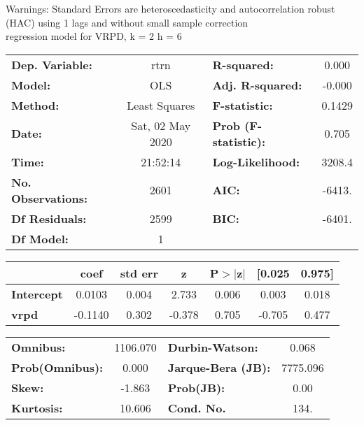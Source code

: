 Warnings: \newline
 [1] Standard Errors are heteroscedasticity and autocorrelation robust (HAC) using 1 lags and without small sample correction\\ 

regression model for VRPD, k = 2 h = 6\begin{center}
\begin{tabular}{lclc}
\toprule
\textbf{Dep. Variable:}    &       rtrn       & \textbf{  R-squared:         } &     0.000   \\
\textbf{Model:}            &       OLS        & \textbf{  Adj. R-squared:    } &    -0.000   \\
\textbf{Method:}           &  Least Squares   & \textbf{  F-statistic:       } &    0.1429   \\
\textbf{Date:}             & Sat, 02 May 2020 & \textbf{  Prob (F-statistic):} &    0.705    \\
\textbf{Time:}             &     21:52:14     & \textbf{  Log-Likelihood:    } &    3208.4   \\
\textbf{No. Observations:} &        2601      & \textbf{  AIC:               } &    -6413.   \\
\textbf{Df Residuals:}     &        2599      & \textbf{  BIC:               } &    -6401.   \\
\textbf{Df Model:}         &           1      & \textbf{                     } &             \\
\bottomrule
\end{tabular}
\begin{tabular}{lcccccc}
                   & \textbf{coef} & \textbf{std err} & \textbf{z} & \textbf{P$> |$z$|$} & \textbf{[0.025} & \textbf{0.975]}  \\
\midrule
\textbf{Intercept} &       0.0103  &        0.004     &     2.733  &         0.006        &        0.003    &        0.018     \\
\textbf{vrpd}      &      -0.1140  &        0.302     &    -0.378  &         0.705        &       -0.705    &        0.477     \\
\bottomrule
\end{tabular}
\begin{tabular}{lclc}
\textbf{Omnibus:}       & 1106.070 & \textbf{  Durbin-Watson:     } &    0.068  \\
\textbf{Prob(Omnibus):} &   0.000  & \textbf{  Jarque-Bera (JB):  } & 7775.096  \\
\textbf{Skew:}          &  -1.863  & \textbf{  Prob(JB):          } &     0.00  \\
\textbf{Kurtosis:}      &  10.606  & \textbf{  Cond. No.          } &     134.  \\
\bottomrule
\end{tabular}
\end{center}

